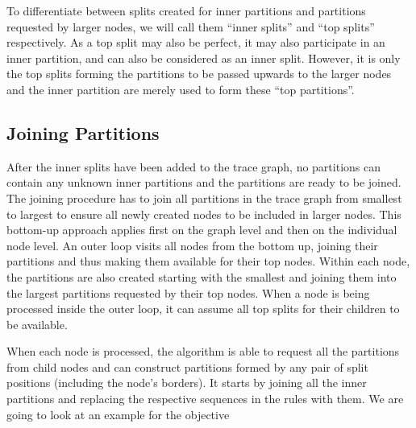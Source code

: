 To differentiate between splits created for inner partitions and partitions requested by larger nodes, we will call them ``inner splits'' and ``top splits'' respectively. As a top split may also be perfect, it may also participate in an inner partition, and can also be considered as an inner split. However, it is only the top splits forming the partitions to be passed upwards to the larger nodes and the inner partition are merely used to form these ``top partitions''.

\subsection{Joining Partitions}

After the inner splits have been added to the trace graph, no partitions can contain any unknown inner partitions and the partitions are ready to be joined. The joining procedure has to join all partitions in the trace graph from smallest to largest to ensure all newly created nodes to be included in larger nodes. This bottom-up approach applies first on the graph level and then on the individual node level. An outer loop visits all nodes from the bottom up, joining their partitions and thus making them available for their top nodes. Within each node, the partitions are also created starting with the smallest and joining them into the largest partitions requested by their top nodes. When a node is being processed inside the outer loop, it can assume all top splits for their children to be available.

%

\noindent When each node is processed, the algorithm is able to request all the partitions from child nodes and can construct partitions formed by any pair of split positions (including the node's borders). It starts by joining all the inner partitions and replacing the respective sequences in the rules with them. We are going to look at an example for the objective

